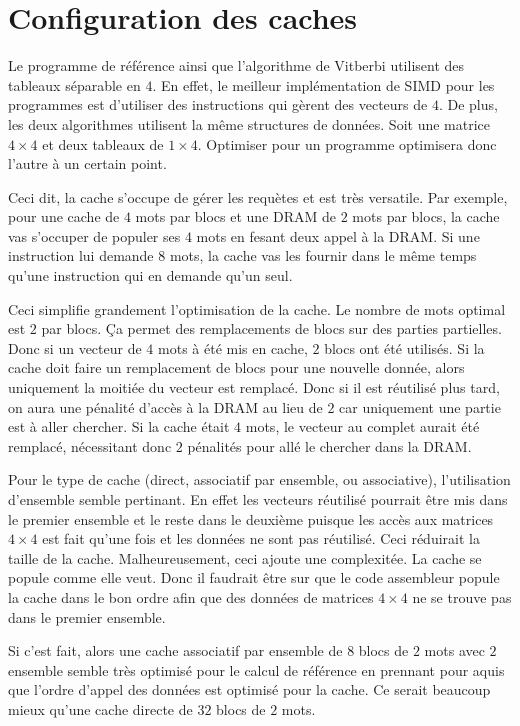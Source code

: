 \documentclass[a11paper]{article}
\newcommand{\todo}[1]{\begin{color}{Red}\textbf{TODO:} #1\end{color}}
\begin{document}
\section{Configuration des caches}
Le programme de référence ainsi que l'algorithme de Vitberbi utilisent des
tableaux séparable en $4$. En effet, le meilleur implémentation de SIMD pour
les programmes est d'utiliser des instructions qui gèrent des vecteurs de $4$.
De plus, les deux algorithmes utilisent la même structures de données. Soit une
matrice $4\times4$ et deux tableaux de $1\times4$. Optimiser pour un programme
optimisera donc l'autre à un certain point.

Ceci dit, la cache s'occupe de gérer les requètes et est très versatile. Par
exemple, pour une cache de $4$ mots par blocs et une DRAM de $2$ mots par
blocs, la cache vas s'occuper de populer ses $4$ mots en fesant deux appel
à la DRAM. Si une instruction lui demande $8$ mots, la cache vas les fournir
dans le même temps qu'une instruction qui en demande qu'un seul.

Ceci simplifie grandement l'optimisation de la cache. Le nombre de mots optimal
est $2$ par blocs. Ça permet des remplacements de blocs sur des parties
partielles. Donc si un vecteur de $4$ mots à été mis en cache, $2$ blocs ont
été utilisés. Si la cache doit faire un remplacement de blocs pour une
nouvelle donnée, alors uniquement la moitiée du vecteur est remplacé. Donc
si il est réutilisé plus tard, on aura une pénalité d'accès à la DRAM au lieu
de $2$ car uniquement une partie est à aller chercher. Si la cache était $4$
mots, le vecteur au complet aurait été remplacé, nécessitant donc $2$ pénalités
pour allé le chercher dans la DRAM.

Pour le type de cache (direct, associatif par ensemble, ou associative),
l'utilisation d'ensemble semble pertinant. En effet les vecteurs réutilisé
pourrait être mis dans le premier ensemble et le reste dans le deuxième puisque
les accès aux matrices $4\times4$ est fait qu'une fois et les données ne sont
pas réutilisé. Ceci réduirait la taille de la cache. Malheureusement, ceci
ajoute une complexitée. La cache se popule comme elle veut. Donc il faudrait
être sur que le code assembleur popule la cache dans le bon ordre afin que des
données de matrices $4\times4$ ne se trouve pas dans le premier ensemble.

Si c'est fait, alors une cache associatif par ensemble de $8$ blocs de $2$ mots
avec $2$ ensemble semble très optimisé pour le calcul de référence en prennant
pour aquis que l'ordre d'appel des données est optimisé pour la cache. Ce
serait beaucoup mieux qu'une cache directe de $32$ blocs de $2$ mots.
\end{document}
